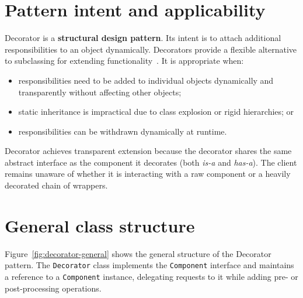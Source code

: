 \documentclass[11pt,a4paper]{report}
\begin{document}
\section{Pattern intent and applicability}
Decorator is a \textbf{structural design pattern}. Its intent is to attach additional responsibilities to an object dynamically. Decorators provide a flexible alternative to subclassing for extending functionality~\cite{gof}. It is appropriate when:
\begin{itemize}
  \item responsibilities need to be added to individual objects dynamically and transparently without affecting other objects;
  \item static inheritance is impractical due to class explosion or rigid hierarchies; or
  \item responsibilities can be withdrawn dynamically at runtime.
\end{itemize}

Decorator achieves transparent extension because the decorator shares the same abstract interface as the component it decorates (both \textit{is-a} and \textit{has-a}). The client remains unaware of whether it is interacting with a raw component or a heavily decorated chain of wrappers.

\section{General class structure}
Figure~\ref{fig:decorator-general} shows the general structure of the Decorator pattern. The \texttt{Decorator} class implements the \texttt{Component} interface and maintains a reference to a \texttt{Component} instance, delegating requests to it while adding pre- or post-processing operations.
\end{document}
